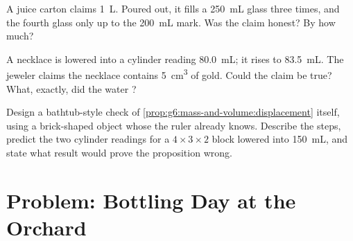 \begin{exercise}[$\star\star$]\label{exo:g6:mass-and-volume:10}
A juice carton claims \qty{1}{L}. Poured out, it fills a
\qty{250}{mL} glass three times, and the fourth glass only up to
the \qty{200}{mL} mark. Was the claim honest? By how much?
\end{exercise}

\begin{exercise}[$\star\star$]\label{exo:g6:mass-and-volume:11}
A necklace is lowered into a cylinder reading \qty{80.0}{mL}; it
rises to \qty{83.5}{mL}. The jeweler claims the necklace contains
\qty{5}{cm^3} of gold. Could the claim be true? What, exactly,
did the water ?
\end{exercise}

\begin{exercise}[$\star\star\star$]\label{exo:g6:mass-and-volume:12}
Design a bathtub-style check of
\cref{prop:g6:mass-and-volume:displacement} itself, using a
brick-shaped object whose  the ruler already knows. Describe
the steps, predict the two cylinder readings for a
$4 \times 3 \times 2$  block lowered into
\qty{150}{mL}, and state what result would prove the proposition
wrong.
\end{exercise}

\section{Problem: Bottling Day at the Orchard}

